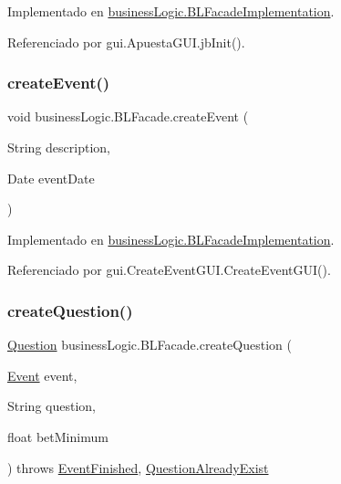 Implementado en \mbox{\hyperlink{classbusinessLogic_1_1BLFacadeImplementation_a301913f0d5beb5b7a7b4d51283a41011}{business\+Logic.\+B\+L\+Facade\+Implementation}}.



Referenciado por gui.\+Apuesta\+G\+U\+I.\+jb\+Init().

\mbox{\label{interfacebusinessLogic_1_1BLFacade_a8ff6dbaab4c3d5312c655bce4fedfff3}} 
\subsubsection{\texorpdfstring{createEvent()}{createEvent()}}
{\footnotesize\ttfamily void business\+Logic.\+B\+L\+Facade.\+create\+Event (\begin{DoxyParamCaption}\item[{String}]{description,  }\item[{Date}]{event\+Date }\end{DoxyParamCaption})}



Implementado en \mbox{\hyperlink{classbusinessLogic_1_1BLFacadeImplementation_a504f1b6069b3d166881c8047836a1d76}{business\+Logic.\+B\+L\+Facade\+Implementation}}.



Referenciado por gui.\+Create\+Event\+G\+U\+I.\+Create\+Event\+G\+U\+I().

\mbox{\label{interfacebusinessLogic_1_1BLFacade_a64a013f322555816e67b601d38f53a1a}} 
\subsubsection{\texorpdfstring{createQuestion()}{createQuestion()}\hspace{0.1cm}{\footnotesize\ttfamily [1/2]}}
{\footnotesize\ttfamily \mbox{\hyperlink{classdomain_1_1Question}{Question}} business\+Logic.\+B\+L\+Facade.\+create\+Question (\begin{DoxyParamCaption}\item[{\mbox{\hyperlink{classdomain_1_1Event}{Event}}}]{event,  }\item[{String}]{question,  }\item[{float}]{bet\+Minimum }\end{DoxyParamCaption}) throws \mbox{\hyperlink{classexceptions_1_1EventFinished}{Event\+Finished}}, \mbox{\hyperlink{classexceptions_1_1QuestionAlreadyExist}{Question\+Already\+Exist}}}

